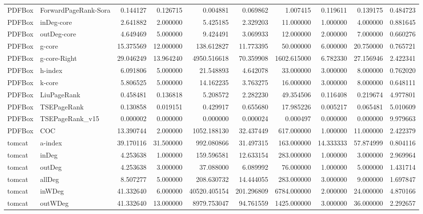 \begin{tabular}{llrrrrrrrr}
PDFBox & ForwardPageRank-Sora & 0.144127 & 0.126715 & 0.004881 & 0.069862 & 1.007415 & 0.119611 & 0.139175 & 0.484723 \\
PDFBox & inDeg-core & 2.641882 & 2.000000 & 5.425185 & 2.329203 & 11.000000 & 1.000000 & 4.000000 & 0.881645 \\
PDFBox & outDeg-core & 4.649469 & 5.000000 & 9.424491 & 3.069933 & 12.000000 & 2.000000 & 7.000000 & 0.660276 \\
PDFBox & g-core & 15.375569 & 12.000000 & 138.612827 & 11.773395 & 50.000000 & 6.000000 & 20.750000 & 0.765721 \\
PDFBox & g-core-Right & 29.046249 & 13.964240 & 4950.516618 & 70.359908 & 1602.615000 & 6.782330 & 27.156946 & 2.422341 \\
PDFBox & h-index & 6.091806 & 5.000000 & 21.548893 & 4.642078 & 33.000000 & 3.000000 & 8.000000 & 0.762020 \\
PDFBox & k-core & 5.806525 & 5.000000 & 14.162235 & 3.763275 & 16.000000 & 3.000000 & 8.000000 & 0.648111 \\
PDFBox & LiuPageRank & 0.458481 & 0.136818 & 5.208572 & 2.282230 & 49.354506 & 0.116408 & 0.219674 & 4.977801 \\
PDFBox & TSEPageRank & 0.130858 & 0.019151 & 0.429917 & 0.655680 & 17.985226 & 0.005217 & 0.065481 & 5.010609 \\
PDFBox & TSEPageRank_v15 & 0.000002 & 0.000000 & 0.000000 & 0.000024 & 0.000497 & 0.000000 & 0.000000 & 9.979663 \\
PDFBox & COC & 13.390744 & 2.000000 & 1052.188130 & 32.437449 & 617.000000 & 1.000000 & 11.000000 & 2.422379 \\
tomcat & a-index & 39.170116 & 31.500000 & 992.080866 & 31.497315 & 163.000000 & 14.333333 & 57.874999 & 0.804116 \\
tomcat & inDeg & 4.253638 & 1.000000 & 159.596581 & 12.633154 & 283.000000 & 1.000000 & 3.000000 & 2.969964 \\
tomcat & outDeg & 4.253638 & 3.000000 & 37.088000 & 6.089992 & 76.000000 & 1.000000 & 5.000000 & 1.431714 \\
tomcat & allDeg & 8.507277 & 5.000000 & 208.630732 & 14.444055 & 283.000000 & 3.000000 & 9.000000 & 1.697847 \\
tomcat & inWDeg & 41.332640 & 6.000000 & 40520.405154 & 201.296809 & 6784.000000 & 2.000000 & 24.000000 & 4.870166 \\
tomcat & outWDeg & 41.332640 & 13.000000 & 8979.753047 & 94.761559 & 1425.000000 & 3.000000 & 36.000000 & 2.292657 \\

\end{tabular}

